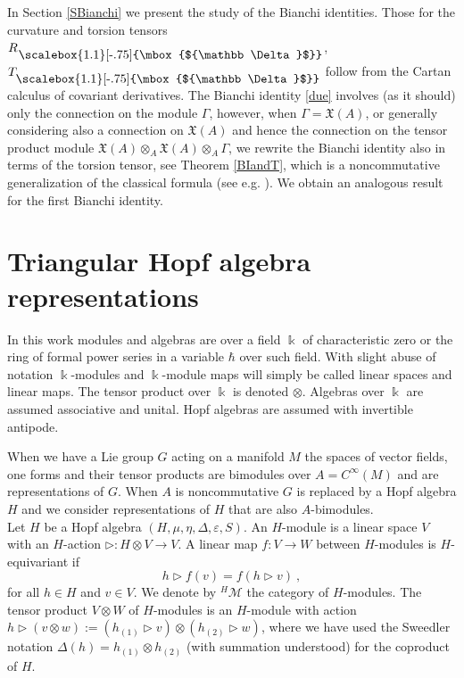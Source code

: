 \documentclass[12pt]{article}
\numberwithin{equation}{section}
\theoremstyle{plain}
\theoremstyle{definition}
\theoremstyle{remark}
\def\Vect{\mathfrak{X}}
\def\oA{\otimes_A}
\def\dd{\mathrm{d}}
\def\MMM{\mathscr{M}}
\def\ra{\triangleright}
\def\dd{{\nabla}}
\def\dd{\mathrm{d}}
\def\pstd{{}^{\phantom{J}}_{\raisebox{\depth}{\scalebox{1.1}[-.75]{\mbox{${\mathbb
            \Delta}$}}}}}
\def\stdd{\phantom{\!\!\!\dd}\pstd}
\def\hxi{h}
\begin{document}
In Section \ref{SBianchi} we present the study of the Bianchi identities.
Those for the curvature and torsion tensors $R\stdd$, $T\!\stdd$ follow from the Cartan calculus of covariant derivatives. The Bianchi identity \eqref{due} involves (as it should) only the connection on the module $\Gamma$, however, when $\Gamma=\Vect(A)$, or generally considering also a connection on $\Vect(A)$ and hence the connection on the tensor product module $\Vect(A)\oA\Vect(A)\oA\Gamma$,
we rewrite the Bianchi identity also in terms  of the torsion tensor, see Theorem \ref{BIandT}, which is a noncommutative generalization of the classical formula (see e.g. \cite[Thm. 5.3]{KN}).  We obtain an analogous result for the first Bianchi identity.



\section{Triangular Hopf algebra representations}\label{section2}
In this work modules and algebras are over a field 
 $\Bbbk$ of characteristic zero 
or the ring of formal power series in a variable $\hbar$ over such
field. With slight abuse of notation $\Bbbk$-modules and
$\Bbbk$-module maps will simply be
called linear spaces and linear maps.   The tensor
product over $\Bbbk$ is denoted $\otimes$. Algebras over $\Bbbk$ are
assumed associative and unital. Hopf algebras are assumed with invertible antipode. 

When we have a Lie group $G$ acting on a manifold $M$ the spaces of
vector fields, one forms and their tensor products are bimodules over
$A=C^\infty(M)$ and are representations of $G$. When $A$ is
noncommutative $G$ is replaced by a Hopf algebra $H$ and we consider
representations of $H$ that are also $A$-bimodules. \\

Let $H$ be a Hopf algebra $(H,\mu,\eta,\Delta,\varepsilon, S)$. An
$H$-module is a  linear space $V$ with an
$H$-action $\ra : H\otimes {V}\to {V}$. A linear map $f: V\to
W$ between $H$-modules is $H$-equivariant
if 
\begin{equation}\label{eqn:Hequivariance}
 \hxi\ra f(v) =f(\hxi\ra v) ~,
\end{equation}
for all $\hxi\in H$ and $v\in {V}$.
We denote by  ${}^H\MMM$ the category of $H$-modules. 
 The tensor product $V\otimes W$ of $H$-modules 
 is an $H$-module  with action  $h\ra (v\otimes w):=(h_{(1)} \ra v) \otimes (h_{(2)} \ra w)$,
 where we have used the Sweedler notation $\Delta(h) = h_{(1)}\otimes h_{(2)}$ (with summation understood) for the coproduct of $H$. 
\end{document}
